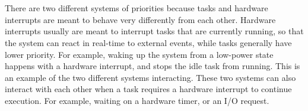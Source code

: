 \section{}
There are two different systems of priorities because tasks and hardware
interrupts are meant to behave very differently from each other. Hardware
interrupts usually are meant to interrupt tasks that are currently running, so
that the system can react in real-time to external events, while tasks generally
have lower priority. For example, waking up the system from a low-power state
happens with a hardware interrupt, and stops the idle task from running. This is
an example of the two different systems interacting. These
two systems can also interact with each other when a task requires a hardware
interrupt to continue execution. For example, waiting on a hardware timer, or an
I/O request.
